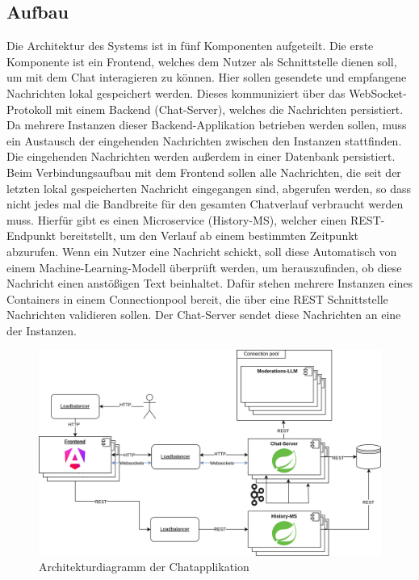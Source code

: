\documentclass[12pt]{report}
\begin{document}
\subsection{Aufbau}
Die Architektur des Systems ist in fünf Komponenten aufgeteilt. Die erste Komponente ist ein Frontend, welches dem Nutzer als Schnittstelle dienen soll, um mit dem Chat interagieren zu können. Hier sollen gesendete und empfangene Nachrichten lokal gespeichert werden.  Dieses kommuniziert über das WebSocket-Protokoll mit einem Backend (Chat-Server), welches die Nachrichten persistiert. Da mehrere Instanzen dieser Backend-Applikation betrieben werden sollen, muss ein Austausch der eingehenden Nachrichten zwischen den Instanzen stattfinden. Die eingehenden Nachrichten werden außerdem in einer Datenbank persistiert. 
Beim Verbindungsaufbau mit dem Frontend sollen alle Nachrichten, die seit der letzten lokal gespeicherten Nachricht eingegangen sind, abgerufen werden, so dass nicht jedes mal die Bandbreite für den gesamten Chatverlauf verbraucht werden muss. Hierfür gibt es einen Microservice (History-MS), welcher einen REST-Endpunkt bereitstellt, um den Verlauf ab einem bestimmten Zeitpunkt abzurufen.
Wenn ein Nutzer eine Nachricht schickt, soll diese Automatisch von einem Machine-Learning-Modell überprüft werden, um herauszufinden, ob diese Nachricht einen anstößigen Text beinhaltet. Dafür stehen mehrere Instanzen eines Containers in einem Connectionpool bereit, die über eine REST Schnittstelle Nachrichten validieren sollen. Der Chat-Server sendet diese Nachrichten an eine der Instanzen. 
\begin{figure}[htbp]
	\centering
	\includegraphics[width=\linewidth]{architektur}
	\caption{Architekturdiagramm der Chatapplikation}
	\label{fig:Architektur}
\end{figure}
\end{document}
